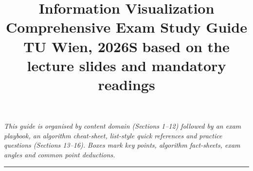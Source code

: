 \documentclass[11pt]{article}
\title{\vspace{-1.2cm}\textbf{\textcolor{tuwdark}{Information Visualization}}\\[2mm]
       \Large\textcolor{tuwblue}{Comprehensive Exam Study Guide}\\[2mm]
       \normalsize TU Wien, 2026S\,\textemdash\,based on the lecture slides and mandatory readings}
\author{}
\date{}
\begin{document}
\maketitle
\vspace{-1.4cm}
\begin{center}\small\itshape
This guide is organised by content domain (Sections 1--12) followed by an
exam playbook, an algorithm cheat-sheet, list-style quick references and
practice questions (Sections 13--16). Boxes mark \textcolor{tuwblue}{key points},
\textcolor{tuwdark}{algorithm fact-sheets}, \textcolor{examorange}{exam angles}
and \textcolor{pitred}{common point deductions}.
\end{center}
\vspace{2mm}
\hrule
\tableofcontents
\clearpage


















\appendix

\end{document}
